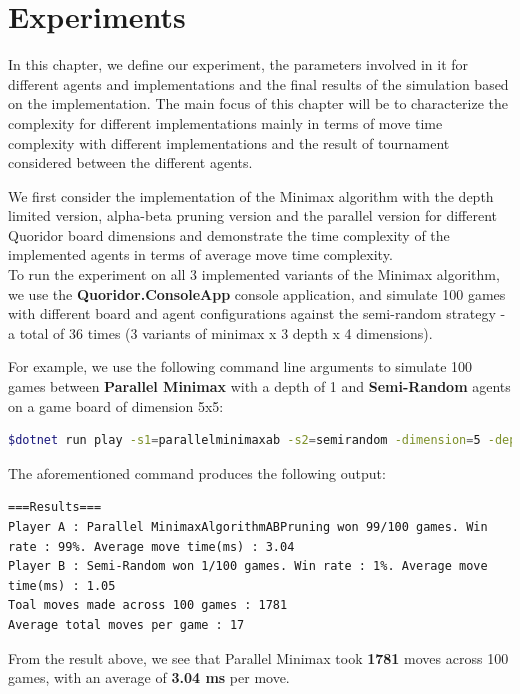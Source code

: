 \chapter{Experiments} \label{Experiments}

In this chapter, we define our experiment, the parameters involved in it for different agents and implementations and the final results of the simulation based on the implementation. The main focus of this chapter will be to characterize the complexity for different implementations mainly in terms of move time complexity with different implementations and the result of tournament considered between the different agents.

We first consider the implementation of the Minimax algorithm with the depth limited version, alpha-beta pruning version and the parallel version for different Quoridor board dimensions and demonstrate the time complexity of the implemented agents in terms of average move time complexity.\\
To run the experiment on all 3 implemented variants of the Minimax algorithm, we use the \textbf{Quoridor.ConsoleApp} console application, and simulate 100 games with different board and agent configurations against the semi-random strategy - a total of 36 times (3 variants of minimax x 3 depth x 4 dimensions).

For example, we use the following command line arguments to simulate 100 games between \textbf{Parallel Minimax} with a depth of 1 and \textbf{Semi-Random} agents on a game board of dimension 5x5:

\begin{lstlisting}[language=bash]
$dotnet run play -s1=parallelminimaxab -s2=semirandom -dimension=5 -depth=1 -sim -numsim=100
\end{lstlisting}

The aforementioned command produces the following output:

\begin{lstlisting}
===Results===
Player A : Parallel MinimaxAlgorithmABPruning won 99/100 games. Win rate : 99%. Average move time(ms) : 3.04
Player B : Semi-Random won 1/100 games. Win rate : 1%. Average move time(ms) : 1.05
Toal moves made across 100 games : 1781
Average total moves per game : 17
\end{lstlisting}

From the result above, we see that Parallel Minimax took \textbf{1781} moves across 100 games, with an average of \textbf{3.04 ms} per move.

